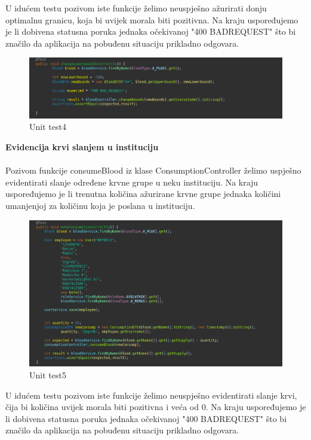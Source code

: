 \eject
{U idućem testu pozivom iste funkcije želimo neuspješno ažurirati donju optimalnu granicu, koja bi uvijek morala biti pozitivna. Na kraju uspoređujemo je li dobivena statusna poruka jednaka očekivanoj "400 BADREQUEST" što bi značilo da aplikacija na pobuđenu situaciju prikladno odgovara.}
\begin{figure}[H]
	\centering
	\includegraphics[width=\textwidth, scale=0.5]{slike/unit4}
	\caption{Unit test4}
\end{figure}
\textbf{Evidencija krvi slanjem u instituciju}
\\\\
Pozivom funkcije consumeBlood iz klase ConsumptionController želimo uspješno evidentirati slanje određene krvne grupe u neku instituciju. Na kraju uspoređujemo je li trenutna količina ažurirane krvne grupe jednaka količini umanjenjoj za količinu koja je poslana u instituciju.
\begin{figure}[H]
	\centering
	\includegraphics[width=\textwidth, scale=0.5]{slike/unit5}
	\caption{Unit test5}
\end{figure}
\eject	
{U idućem testu pozivom iste funkcije želimo neuspješno evidentirati slanje krvi, čija bi količina uvijek morala biti pozitivna i veća od 0. Na kraju uspoređujemo je li dobivena statusna poruka jednaka očekivanoj "400 BADREQUEST" što bi značilo da aplikacija na pobuđenu situaciju prikladno odgovara. }
